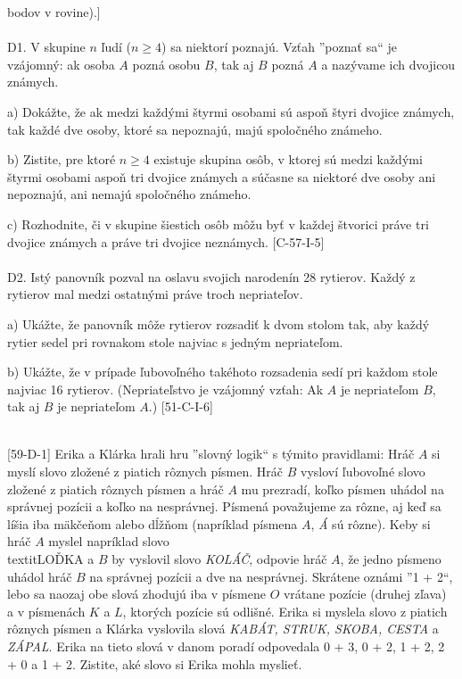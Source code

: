 bodov v rovine).]\\
\\
D1. V skupine $n$ ľudí ($n \geq 4$) sa niektorí poznajú. Vzťah ”poznať sa“ je vzájomný: ak osoba $A$ pozná osobu $B$, tak aj $B$ pozná $A$ a nazývame ich dvojicou známych.

a) Dokážte, že ak medzi každými štyrmi osobami sú aspoň štyri dvojice známych, tak každé dve osoby, ktoré sa nepoznajú, majú spoločného známeho.

b) Zistite, pre ktoré $n \geq 4$ existuje skupina osôb, v ktorej sú medzi každými štyrmi osobami aspoň tri dvojice známych a súčasne sa niektoré dve osoby ani nepoznajú, ani nemajú spoločného známeho.

c) Rozhodnite, či v skupine šiestich osôb môžu byť v každej štvorici práve tri dvojice známych a práve tri dvojice neznámych. [C-57-I-5]\\
\\
D2. Istý panovník pozval na oslavu svojich narodenín 28 rytierov. Každý z rytierov mal medzi ostatnými práve troch nepriateľov.

a) Ukážte, že panovník môže rytierov rozsadiť k dvom stolom tak, aby každý rytier sedel pri rovnakom stole najviac s jedným nepriateľom.

b) Ukážte, že v prípade ľubovoľného takéhoto rozsadenia sedí pri každom stole najviac 16 rytierov. (Nepriateľstvo je vzájomný vzťah: Ak $A$ je nepriateľom $B$, tak aj $B$ je nepriateľom $A$.) [51-C-I-6]\\
\\
\begin{tcolorbox}[breakable,notitle,boxrule=0pt,colback=light-gray,colframe=light-gray]\ul [59-D-1]
Erika a Klárka hrali hru ”slovný logik“ s týmito pravidlami: Hráč $A$ si myslí slovo zložené z piatich rôznych písmen. Hráč $B$ vysloví ľubovoľné slovo zložené z piatich rôznych písmen a hráč $A$ mu prezradí, koľko písmen uhádol na správnej pozícii a koľko na nesprávnej. Písmená považujeme za rôzne, aj keď sa líšia iba mäkčeňom alebo dĺžňom (napríklad písmena $A$, \textit{Á} sú rôzne). Keby si hráč $A$ myslel napríklad slovo \\textit{LOĎKA} a $B$ by vyslovil slovo \textit{KOLÁČ}, odpovie hráč $A$, že jedno písmeno uhádol hráč $B$ na správnej pozícii a dve na nesprávnej. Skrátene oznámi ”1 + 2“, lebo sa naozaj obe slová zhodujú iba v písmene $O$ vrátane pozície (druhej zľava) a v písmenách $K$ a $L$, ktorých pozície sú odlišné. Erika si myslela slovo z piatich rôznych písmen a Klárka vyslovila slová \textit{KABÁT, STRUK, SKOBA, CESTA} a \textit{ZÁPAL}. Erika na tieto slová v danom poradí odpovedala 0 + 3, 0 + 2, 1 + 2, 2 + 0 a 1 + 2. Zistite, aké slovo si Erika mohla myslieť.

\end{tcolorbox}


